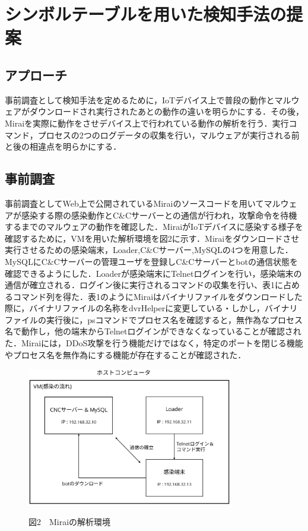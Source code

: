 \chapter{シンボルテーブルを用いた検知手法の提案}

\section{アプローチ}
事前調査として検知手法を定めるために，IoTデバイス上で普段の動作とマルウェアがダウンロードされ実行されたあとの動作の違いを明らかにする．その後，Miraiを実際に動作をさせデバイス上で行われている動作の解析を行う．実行コマンド，プロセスの2つのログデータの収集を行い，マルウェアが実行される前と後の相違点を明らかにする．

\section{事前調査}
事前調査としてWeb上で公開されているMiraiのソースコードを用いてマルウェアが感染する際の感染動作とC\&Cサーバーとの通信が行われ，攻撃命令を待機するまでのマルウェアの動作を確認した．MiraiがIoTデバイスに感染する様子を確認するために，VMを用いた解析環境を図2に示す．Miraiをダウンロードさせ実行させるための感染端末，Loader,C\&Cサーバー,MySQLの4つを用意した．MySQLにC\&Cサーバーの管理ユーザを登録しC\&Cサーバーとbotの通信状態を確認できるようにした．Loaderが感染端末にTelnetログインを行い，感染端末の通信が確立される．ログイン後に実行されるコマンドの収集を行い、表1に占めるコマンド列を得た．表1のようにMiraiはバイナリファイルをダウンロードした際に，バイナリファイルの名称をdvrHelperに変更している・しかし，バイナリファイルの実行後に，psコマンドでプロセス名を確認すると，無作為なプロセス名で動作し，他の端末からTelnetログインができなくなっていることが確認された．Miraiには，DDoS攻撃を行う機能だけではなく，特定のポートを閉じる機能やプロセス名を無作為にする機能が存在することが確認された．
 \begin{figure}[h]
 \centering
    \includegraphics[width=90mm]{figures/VM.eps}
 \label{fig:model}
 \begin{center}図2　Miraiの解析環境\end{center}
 \end{figure}
 \newpage


